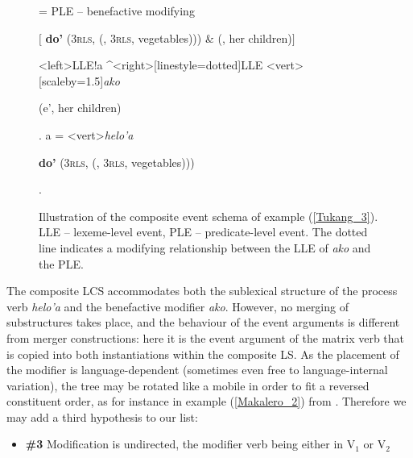 \begin{figure}
\jtree[xunit=9.5em,yunit=2em]
\! = {PLE -- benefactive modifying}{\begin{scriptsize} $[$ \textbf{do'} (3\textsc{rls}, \textbf{} (, 3\textsc{rls}, vegetables))) \& (, her children)$]$\end{scriptsize}}
<left>{LLE}!a ^<right>[linestyle=dotted]{LLE}
<vert>[scaleby=1.5]{\textit{ako}}{\begin{scriptsize}  (e', her children)\end{scriptsize}}.
\!a = <vert>{\textit{helo'a}}
{\begin{scriptsize} \textbf{do'} (3\textsc{rls}, \textbf{} (, 3\textsc{rls}, vegetables)))\end{scriptsize}}.
\endjtree

\caption[Event schema illustration of example (\ref{Tukang_3})]{Illustration of the composite event schema of example (\ref{Tukang_3}). LLE -- lexeme-level event, PLE -- predicate-level event. The dotted line indicates a modifying relationship between the LLE of \textit{ako} and the PLE.}
\label{figure:eventschema_Maybrat97b}
\end{figure}

The composite LCS accommodates both the sublexical structure of the process verb \textit{helo'a} and the benefactive modifier \textit{ako}. However, no merging of substructures takes place, and the behaviour of the event arguments is different from merger constructions: here it is the event argument of the matrix verb that is copied into both instantiations within the composite LS. As the placement of the modifier is language-dependent (sometimes even free to language-internal variation), the tree may be rotated like a mobile in order to fit a reversed constituent order, as for instance in example (\ref{Makalero_2}) from . Therefore we may add a third hypothesis to our list:

\begin{itemize}
\item \textbf{\#3} Modification is undirected, the modifier verb being either in V$_1$ or V$_2$
\end{itemize}


